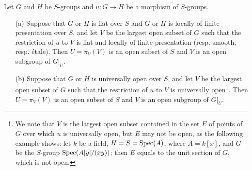 \begin{proposition}\label{scheme group morphism restriction to local fp smooth uo locus}
Let $G$ and $H$ be $S$-groups and $u:G\to H$ be a morphism of $S$-groups.
\begin{enumerate}
    \item[(a)] Suppose that $G$ or $H$ is flat over $S$ and $G$ or $H$ is locally of finite presentation over $S$, and let $V$ be the largest open subset of $G$ such that the restriction of $u$ to $V$ is flat and locally of finite presentation (resp. smooth, resp. \'etale). Then $U=\pi_V(V)$ is an open subset of $S$ and $V$ is an open subgroup of $G|_U$.
    \item[(b)] Suppose that $G$ or $H$ is universally open over $S$, and let $V$ be the largest open subset of $G$ such that the restriction of $u$ to $V$ is universally open\footnote{We note that $V$ is the largest open subset contained in the set $E$ of points of $G$ over which $u$ is universally open, but $E$ may not be open, as the following example shows: let $k$ be a field, $H=S=\mathrm{Spec}(A)$, where $A=k[x]$, and $G$ be the $S$-group $\mathrm{Spec}(A[y]/(xy))$; then $E$ equals to the unit section of $G$, which is not open.}. Then $U=\pi_V(V)$ is an open subset of $S$ and $V$ is an open subgroup of $G|_U$.
\end{enumerate}
\end{proposition}
